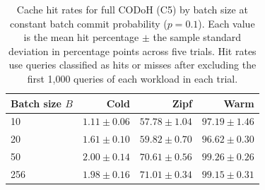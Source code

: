 \begin{table}[H]
\centering
\begin{tabular}{lrrr}
\toprule
Batch size $B$ & Cold & Zipf & Warm \\
\midrule
10 & $1.11 \pm 0.06$ & $57.78 \pm 1.04$ & $97.19 \pm 1.46$ \\
20 & $1.61 \pm 0.10$ & $59.82 \pm 0.70$ & $96.62 \pm 0.30$ \\
50 & $2.00 \pm 0.14$ & $70.61 \pm 0.56$ & $99.26 \pm 0.26$ \\
256 & $1.98 \pm 0.16$ & $71.01 \pm 0.34$ & $99.15 \pm 0.31$ \\
\bottomrule
\end{tabular}
\caption{Cache hit rates for full CODoH (C5) by batch size at constant batch commit probability ($p = 0.1$).
Each value is the mean hit percentage $\pm$ the sample standard
deviation in percentage points across five trials. Hit rates use
queries classified as hits or misses after excluding the first
1,000 queries of each workload in each trial.}
\label{tab:batch-size-cache-hits}
\end{table}

